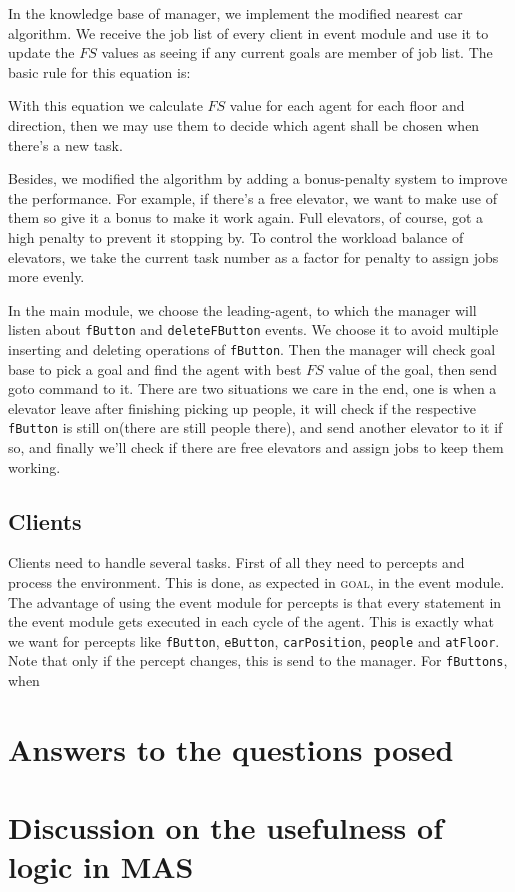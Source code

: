 \documentclass[a4paper,10pt,twocolumn]{article}
\begin{document}
In the knowledge base of manager, we implement the modified nearest car algorithm. We receive the job list of every client in event module and use it to update the $FS$ values as seeing if any current goals are member of job list. The basic rule for this equation is:



With this equation we calculate $FS$ value for each agent for each floor and direction, then we may use them to decide which agent shall be chosen when there's a new task.

Besides, we modified the algorithm by adding a bonus-penalty system to improve the performance. For example, if there's a free elevator, we want to make use of them so give it a bonus to make it work again. Full elevators, of course, got a high penalty to prevent it stopping by. To control the workload balance of elevators, we take the current task number as a factor for penalty to assign jobs more evenly.

In the main module, we choose the leading-agent, to which the manager will listen about \texttt{fButton} and \texttt{deleteFButton} events. We choose it to avoid multiple inserting and deleting operations of \texttt{fButton}. Then the manager will check goal base to pick a goal and find the agent with best $FS$ value of the goal, then send goto command to it. There are two situations we care in the end, one is when a elevator leave after finishing picking up people, it will check if the respective \texttt{fButton} is still on(there are still people there), and send another elevator to it if so, and finally we'll check if there are free elevators and assign jobs to keep them working.

\subsection{Clients}
Clients need to handle several tasks. First of all they need to percepts and process the environment. This is done, as expected in \textsc{goal}, in the event module. The advantage of using the event module for percepts is that every statement in the event module gets executed in each cycle of the agent. This is exactly what we want for percepts like \texttt{fButton}, \texttt{eButton}, \texttt{carPosition}, \texttt{people} and \texttt{atFloor}. Note that only if the percept changes, this is send to the manager. For \texttt{fButtons}, when 

\section{Answers to the questions posed}

\section{Discussion on the usefulness of logic in MAS}
\end{document}

